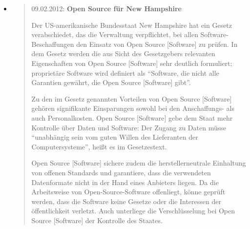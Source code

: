\documentclass[a4paper]{scrartcl}
\begin{document}
\begin{itemize}
Die Bundeswehr schlägt mit ihrer OSS-Strategie einen Weg ein, den auch
das Militär der USA verfolgt: \begin{quote}Red
Hat\footnote{\begin{quote}2010 war Red Hat zum wiederholten Male
in der Top-10-Liste der Unternehmen, die die meisten Commits zum
Linux-Kernel machten. 12,4 Prozent der Arbeiten am Kernel
stammten von Programmierern, die von Red Hat bezahlt werden. Damit sind
sie auf Platz zwei, nach der Gruppe der unbekannten
Beitragenden.\end{quote}
(\url{https://de.wikipedia.org/wiki/Red_Hat} [abgerufen am
13.03.2012])} Enterprise Linux ist beim Verteidigungsministerium der
USA als Standardplattform für serverbasierte Anwendungen, Webdienste,
Datenbanken, Netzwerksicherheit und ähnliches ausgewählt worden.
[\ldots] Das Pentagon ist inzwischen der größte Kunde der Firma Red
Hat.\end{quote}\footnote{\href{https://de.wikipedia.org/wiki/Open-Source-Software_in_?ffentlichen_Einrichtungen}{{https://de.wikipedia.org/wiki/Open-Source-Software\_in\_\%C3\%B6ffentlichen\_Einrichtungen}}
[abgerufen am 05.03.2012])}

\item \begin{quote}09.02.2012: \textbf{Open Source für New Hampshire}

Der US-amerikanische Bundesstaat New Hampshire hat ein Gesetz
verabschiedet, das die Verwaltung verpflichtet, bei allen
Software-Beschaffungen den Einsatz von Open Source [Software] zu
prüfen. In dem Gesetz werden die aus Sicht des Gesetzgebers
relevanten Eigenschaften von Open Source [Software] sehr deutlich
formuliert; proprietäre Software wird definiert als
``Software, die nicht alle Garantien gewährt, die Open
Source [Software] gibt''.

Zu den im Gesetz genannten Vorteilen von Open Source [Software]
gehören signifikante Einsparungen sowohl bei den Anschaffungs- als
auch Personalkosten. Open Source [Software] gebe dem Staat mehr
Kontrolle über Daten und Software: Der Zugang zu Daten müsse
``unabhängig sein vom guten Willen des Lieferanten der
Computersysteme'', heißt es im Gesetzestext.

Open Source [Software] sichere zudem die herstellerneutrale Einhaltung
von offenen Standards und garantiere, dass die verwendeten Datenformate
nicht in der Hand eines Anbieters liegen. Da die Arbeitsweise von
Open-Source-Software offenliegt, könne geprüft werden, dass die
Software keine Gesetze oder die Interessen der öffentlichkeit
verletzt. Auch unterliege die Verschlüsselung bei Open Source
[Software] der Kontrolle des Staates.


\end{quote}
\end{itemize}
\end{document}
